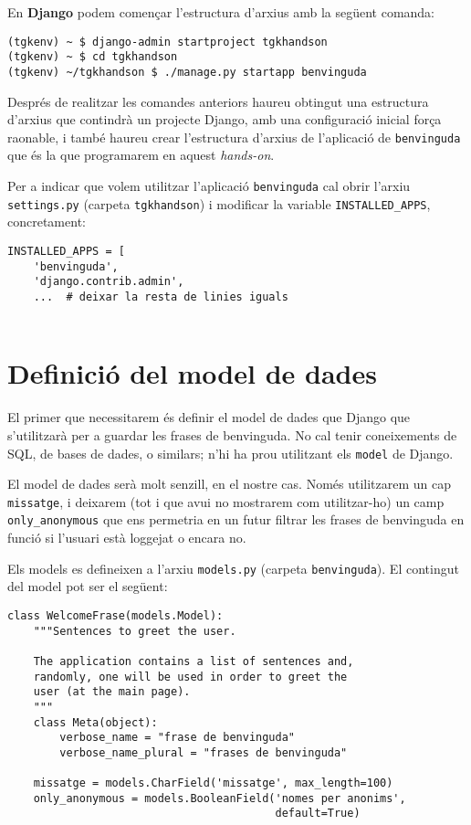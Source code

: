 \documentclass[12pt,a4paper]{article}
\begin{document}
En \textbf{Django} podem començar l'estructura d'arxius amb la següent comanda:

\begin{verbatim}
(tgkenv) ~ $ django-admin startproject tgkhandson
(tgkenv) ~ $ cd tgkhandson
(tgkenv) ~/tgkhandson $ ./manage.py startapp benvinguda
\end{verbatim}

Després de realitzar les comandes anteriors haureu obtingut una estructura d'arxius que contindrà un projecte Django, amb una configuració inicial força raonable, i també haureu crear l'estructura d'arxius de l'aplicació de \verb+benvinguda+ que és la que programarem en aquest \emph{hands-on}.

Per a indicar que volem utilitzar l'aplicació \verb+benvinguda+ cal obrir l'arxiu \verb+settings.py+ (carpeta \verb+tgkhandson+) i modificar la variable \verb+INSTALLED_APPS+, concretament:

\begin{lstlisting}
INSTALLED_APPS = [
    'benvinguda',
    'django.contrib.admin',
    ...  # deixar la resta de linies iguals
    
\end{lstlisting}

\section{Definició del model de dades}

El primer que necessitarem és definir el model de dades que Django que s'utilitzarà per a guardar les frases de benvinguda. No cal tenir coneixements de SQL, de bases de dades, o similars; n'hi ha prou utilitzant els \verb+model+ de Django.

El model de dades serà molt senzill, en el nostre cas. Només utilitzarem un cap \verb+missatge+, i deixarem (tot i que avui no mostrarem com utilitzar-ho) un camp \verb+only_anonymous+ que ens permetria en un futur filtrar les frases de benvinguda en funció si l'usuari està loggejat o encara no.

Els models es defineixen a l'arxiu \verb+models.py+ (carpeta \verb+benvinguda+). El contingut del model pot ser el següent:

\begin{lstlisting}
class WelcomeFrase(models.Model):
    """Sentences to greet the user.

    The application contains a list of sentences and, 
    randomly, one will be used in order to greet the 
    user (at the main page).
    """
    class Meta(object):
        verbose_name = "frase de benvinguda"
        verbose_name_plural = "frases de benvinguda"

    missatge = models.CharField('missatge', max_length=100)
    only_anonymous = models.BooleanField('nomes per anonims', 
                                         default=True)
\end{lstlisting}
\end{document}
